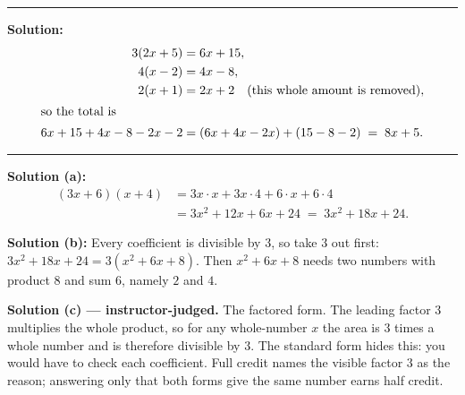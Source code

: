 \documentclass[12pt]{article}
\begin{document}
\vspace{0.15cm}\noindent\rule{\linewidth}{0.2pt}


\textbf{Solution:}
\begin{align*}
  3(2x+5) &= 6x + 15,\\
  4(x-2)  &= 4x - 8,\\
  2(x+1)  &= 2x + 2 \quad\text{(this whole amount is removed)},\\
  \intertext{so the total is}
  6x + 15 + 4x - 8 - 2x - 2 &= (6x + 4x - 2x) + (15 - 8 - 2) \;=\; 8x + 5.
\end{align*}

\vspace{0.15cm}\noindent\rule{\linewidth}{0.2pt}


\textbf{Solution (a):}
\begin{align*}
  (3x+6)(x+4) &= 3x\cdot x + 3x\cdot 4 + 6\cdot x + 6\cdot 4\\
              &= 3x^2 + 12x + 6x + 24 \;=\; 3x^2 + 18x + 24.
\end{align*}

\noindent\textbf{Solution (b):} \quad Every coefficient is divisible by $3$, so take $3$ out first:
$3x^2 + 18x + 24 = 3(x^2 + 6x + 8)$. Then $x^2 + 6x + 8$ needs two numbers with product $8$ and
sum $6$, namely $2$ and $4$. 

\noindent\textbf{Solution (c) --- instructor-judged.} The factored form. The leading factor $3$
multiplies the whole product, so for any whole-number $x$ the area is $3$ times a whole number and
is therefore divisible by $3$. The standard form hides this: you would have to check each
coefficient. Full credit names the visible factor $3$ as the reason; answering only that both
forms give the same number earns half credit.
\end{document}
